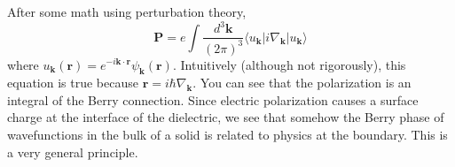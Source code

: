 \documentclass[a4paper,12pt]{article}
\renewcommand{\vec}[1]{\boldsymbol{\mathbf{#1}}}
\begin{document}
After some math using perturbation theory,
\begin{equation}
\vec{P} = e \int \frac{d^3\vec{k}}{(2\pi)^3} \langle u_{\vec{k}} | i \nabla_{\vec{k}} | u_{\vec{k}} \rangle
\end{equation}
where $u_{\vec{k}}(\vec{r}) = e^{-i\vec{k} \cdot \vec{r}} \psi_{\vec{k}}(\vec{r})$.  Intuitively (although not rigorously), this equation is true because $\vec{r} = i \hbar \nabla_{\vec{k}} $.  You can see that the polarization is an integral of the Berry connection.  Since electric polarization causes a surface charge at the interface of the dielectric, we see that somehow the Berry phase of wavefunctions in the bulk of a solid is related to physics at the boundary.  This is a very general principle.
\end{document}
